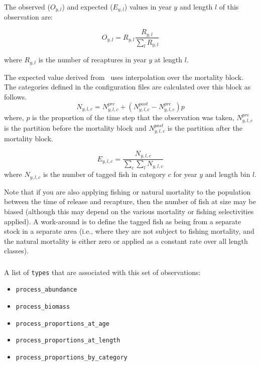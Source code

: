 The observed ($O_{y,l}$) and expected ($E_{y,l}$) values in year $y$ and length $l$ of this observation are:

\begin{equation}
O_{y,l} = R_{y,l} \frac{R_{y,l}}{\sum_l R_{y,l}}
\end{equation}

where $R_{y,l}$ is the number of recaptures in year $y$ at length $l$.

The expected value derived from \CNAME\ uses interpolation over the mortality block. The categories defined in the configuration files are calculated over this block as follows.
\begin{equation}
N_{y,l,c} = N^{pre}_{y,l,c} +   (N^{post}_{y,l,c} - N^{pre}_{y,l,c})p
\end{equation}
where, $p$ is the proportion of the time step that the observation was taken, \(N^{pre}_{y,l,c}\) is the partition before the mortality block and \(N^{post}_{y,l,c}\) is the partition after the mortality block.

\begin{equation}
E_{y,l,c} = \frac{N_{y,l,c}}{\sum_c\sum_l N_{y,l,c}}
\end{equation}
where $N_{y,l,c}$ is the number of tagged fish in category \(c\) for year \(y\) and length bin \(l\).

Note that if you are also applying fishing or natural mortality to the population between the time of release and recapture, then the number of fish at size may be biased (although this may depend on the various mortality or fishing selectivities applied). A work-around is to define the tagged fish as being from a separate stock in a separate area (i.e., where they are not subject to fishing mortality, and the natural mortality is either zero or applied as a constant rate over all length classes).
\fi %


\subsubsection{}

A list of \texttt{types} that are associated with this set of observations:

\begin{itemize}
	\item \texttt{process\_abundance}
	\item \texttt{process\_biomass}
	\item \texttt{process\_proportions\_at\_age}
	\item \texttt{process\_proportions\_at\_length}
	\item \texttt{process\_proportions\_by\_category}
\end{itemize}

